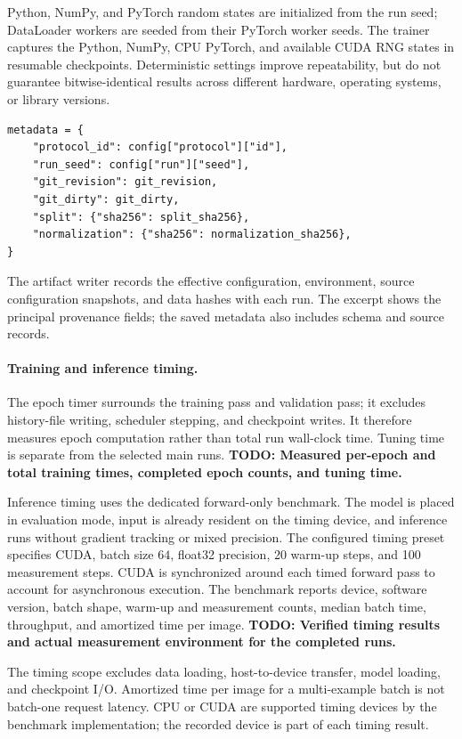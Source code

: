 \documentclass[11pt,a4paper]{article}
\begin{document}
Python, NumPy, and PyTorch random states are initialized from the run seed; DataLoader workers are seeded from their PyTorch worker seeds. The trainer captures the Python, NumPy, CPU PyTorch, and available CUDA RNG states in resumable checkpoints. Deterministic settings improve repeatability, but do not guarantee bitwise-identical results across different hardware, operating systems, or library versions.

\begin{lstlisting}[caption={Representative run-provenance fields saved alongside an experiment.},label={lst:provenance}]
metadata = {
    "protocol_id": config["protocol"]["id"],
    "run_seed": config["run"]["seed"],
    "git_revision": git_revision,
    "git_dirty": git_dirty,
    "split": {"sha256": split_sha256},
    "normalization": {"sha256": normalization_sha256},
}
\end{lstlisting}

The artifact writer records the effective configuration, environment, source configuration snapshots, and data hashes with each run. The excerpt shows the principal provenance fields; the saved metadata also includes schema and source records.

\paragraph{Training and inference timing.} The epoch timer surrounds the training pass and validation pass; it excludes history-file writing, scheduler stepping, and checkpoint writes. It therefore measures epoch computation rather than total run wall-clock time. Tuning time is separate from the selected main runs. \textbf{TODO: Measured per-epoch and total training times, completed epoch counts, and tuning time.}

Inference timing uses the dedicated forward-only benchmark. The model is placed in evaluation mode, input is already resident on the timing device, and inference runs without gradient tracking or mixed precision. The configured timing preset specifies CUDA, batch size \(64\), float32 precision, 20 warm-up steps, and 100 measurement steps. CUDA is synchronized around each timed forward pass to account for asynchronous execution. The benchmark reports device, software version, batch shape, warm-up and measurement counts, median batch time, throughput, and amortized time per image. \textbf{TODO: Verified timing results and actual measurement environment for the completed runs.}

The timing scope excludes data loading, host-to-device transfer, model loading, and checkpoint I/O. Amortized time per image for a multi-example batch is not batch-one request latency. CPU or CUDA are supported timing devices by the benchmark implementation; the recorded device is part of each timing result.
\end{document}
